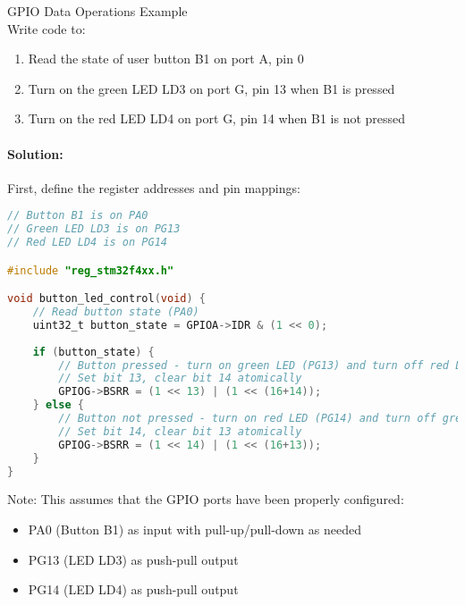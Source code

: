 \begin{example2}{GPIO Data Operations Example}\\
Write code to:
\begin{enumerate}
    \item Read the state of user button B1 on port A, pin 0
    \item Turn on the green LED LD3 on port G, pin 13 when B1 is pressed
    \item Turn on the red LED LD4 on port G, pin 14 when B1 is not pressed
\end{enumerate}

\tcblower
\paragraph{Solution:}
First, define the register addresses and pin mappings:

\begin{lstlisting}[language=C, style=basesmol]
// Button B1 is on PA0
// Green LED LD3 is on PG13
// Red LED LD4 is on PG14

#include "reg_stm32f4xx.h"

void button_led_control(void) {
    // Read button state (PA0)
    uint32_t button_state = GPIOA->IDR & (1 << 0);
    
    if (button_state) {
        // Button pressed - turn on green LED (PG13) and turn off red LED (PG14)
        // Set bit 13, clear bit 14 atomically
        GPIOG->BSRR = (1 << 13) | (1 << (16+14));
    } else {
        // Button not pressed - turn on red LED (PG14) and turn off green LED (PG13)
        // Set bit 14, clear bit 13 atomically
        GPIOG->BSRR = (1 << 14) | (1 << (16+13));
    }
}
\end{lstlisting}

Note: This assumes that the GPIO ports have been properly configured:
\begin{itemize}
    \item PA0 (Button B1) as input with pull-up/pull-down as needed
    \item PG13 (LED LD3) as push-pull output
    \item PG14 (LED LD4) as push-pull output
\end{itemize}
\end{example2}
